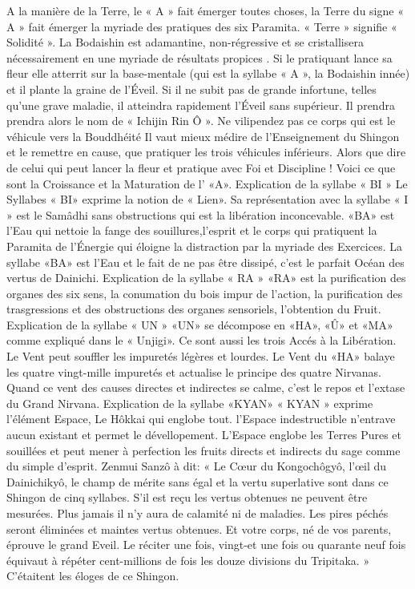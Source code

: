 A la manière de la Terre, le « A » fait émerger  toutes choses, la Terre du signe « A » fait émerger la myriade des pratiques des six Paramita. « Terre » signifie « Solidité ». La Bodaishin est adamantine, non-régressive et se cristallisera nécessairement en une myriade de résultats propices .
Si le pratiquant lance sa fleur elle atterrit sur la base-mentale (qui est la syllabe « A », la Bodaishin innée) et il plante la graine de l’Éveil. Si il ne subit pas de grande infortune, telles qu'une grave maladie, il atteindra rapidement l’Éveil sans supérieur.
Il prendra prendra alors le nom de « Ichijin Rin Ô ». Ne vilipendez pas ce corps qui est le véhicule vers la Bouddhéité
Il vaut mieux médire de l'Enseignement du Shingon et le remettre en cause, que pratiquer les trois véhicules inférieurs. Alors que dire de celui qui peut lancer la fleur  et pratique avec Foi et Discipline !
 Voici ce que sont la  Croissance et la Maturation de l'  «A».
Explication de la syllabe « BI »
Le Syllabes « BI» exprime la notion de « Lien». Sa représentation avec la syllabe « I » est le Samâdhi sans obstructions qui est la libération inconcevable.
«BA» est l’Eau qui nettoie la fange des souillures,l’esprit et le corps qui pratiquent la Paramita de l’Énergie qui éloigne la distraction par la myriade des Exercices. La syllabe «BA» est l’Eau et le fait de ne pas être dissipé, c’est le parfait Océan des vertus de Dainichi.
Explication de la syllabe « RA »
«RA» est la purification des organes des six sens, la conumation du bois impur de l’action, la purification des trasgressions et des obstructions des organes sensoriels, l'obtention du Fruit.
Explication de la syllabe « UN »
«UN» se décompose en «HA», «Û» et «MA» comme expliqué dans le « Unjigi». Ce sont aussi les trois Accés à la Libération. Le Vent peut souffler les impuretés légères et lourdes. Le Vent du «HA» balaye les quatre vingt-mille impuretés et actualise le principe des quatre Nirvanas. Quand ce vent des causes directes et indirectes se calme, c’est le repos et l’extase du Grand Nirvana.
Explication de la syllabe «KYAN»
« KYAN » exprime l’élément Espace, Le Hôkkai qui englobe tout. l’Espace indestructible n’entrave aucun existant et permet le dévellopement. L’Espace englobe les Terres Pures et souillées et peut mener à perfection les fruits directs et indirects du sage comme du simple d’esprit.  
Zenmui Sanzô à dit:
« Le Cœur du Kongochôgyô, l’œil du Dainichikyô, le champ de mérite sans égal et la vertu superlative sont dans ce Shingon de cinq syllabes. S’il est reçu les vertus obtenues ne peuvent être mesurées. Plus jamais il n’y aura de calamité ni de maladies. Les pires péchés seront éliminées et maintes vertus obtenues. Et votre corps, né de vos parents, éprouve le grand Eveil. Le réciter une fois, vingt-et une fois ou quarante neuf fois équivaut à répéter cent-millions de fois les douze divisions du Tripitaka. »
C’étaitent les éloges de ce Shingon.

